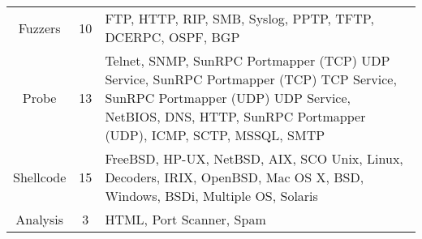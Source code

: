 \begin{table}[htbp]
\begin{tabularx}{\textwidth}{@{}ccX@{}}
		Fuzzers                           & 10                                & FTP, HTTP, RIP, SMB, Syslog, PPTP, TFTP, DCERPC, OSPF, BGP                                                                                                                                                                                                                                                                                                                                                                                                                                                                                                          \\
		Probe                             & 13                                & Telnet, SNMP, SunRPC Portmapper (TCP) UDP Service, SunRPC Portmapper (TCP) TCP Service, SunRPC Portmapper (UDP) UDP Service, NetBIOS, DNS, HTTP,
		SunRPC Portmapper (UDP), ICMP, SCTP, MSSQL, SMTP                                                                                                                                                                                                                                                                                                                                                                                                                                                                                                                                                                                            \\
		Shellcode                         & 15                                & FreeBSD, HP-UX, NetBSD, AIX, SCO Unix, Linux, Decoders, IRIX, OpenBSD, Mac OS X, BSD, Windows, BSDi, Multiple OS, Solaris                                                                                                                                                                                                                                                                                                                                                                                                                                           \\
		Analysis                          & 3                                 & HTML, Port Scanner, Spam                                                                                                                                                                                                                                                                                                                                                                                                                                                                                                                                            \\

\end{tabularx}
\end{table}
